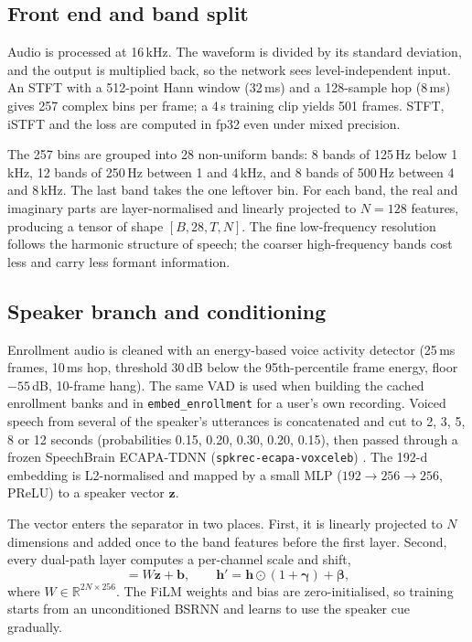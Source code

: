 \documentclass[11pt,a4paper]{article}
\begin{document}
\subsection{Front end and band split}
Audio is processed at 16\,kHz. The waveform is divided by its standard deviation, and the output
is multiplied back, so the network sees level-independent input. An STFT with a 512-point Hann
window (32\,ms) and a 128-sample hop (8\,ms) gives 257 complex bins per frame; a 4\,s training clip
yields 501 frames. STFT, iSTFT and the loss are computed in fp32 even under mixed precision.

The 257 bins are grouped into 28 non-uniform bands: 8 bands of 125\,Hz below 1\,kHz, 12 bands of
250\,Hz between 1 and 4\,kHz, and 8 bands of 500\,Hz between 4 and 8\,kHz. The last band takes the
one leftover bin. For each band, the real and imaginary parts are layer-normalised and linearly
projected to $N=128$ features, producing a tensor of shape $[B,28,T,N]$. The fine low-frequency
resolution follows the harmonic structure of speech; the coarser high-frequency bands cost less
and carry less formant information.

\subsection{Speaker branch and conditioning}
Enrollment audio is cleaned with an energy-based voice activity detector (25\,ms frames, 10\,ms
hop, threshold 30\,dB below the 95th-percentile frame energy, floor $-55$\,dB, 10-frame hang). The
same VAD is used when building the cached enrollment banks and in \texttt{embed\_enrollment} for a
user's own recording. Voiced speech from several of the speaker's utterances is concatenated and
cut to 2, 3, 5, 8 or 12 seconds (probabilities 0.15, 0.20, 0.30, 0.20, 0.15), then passed through
a frozen SpeechBrain ECAPA-TDNN (\texttt{spkrec-ecapa-voxceleb})
\cite{ravanelli2021speechbrain,desplanques2020ecapa}. The 192-d embedding is L2-normalised and
mapped by a small MLP ($192\to256\to256$, PReLU) to a speaker vector $\mathbf{z}$.

The vector enters the separator in two places. First, it is linearly projected to $N$ dimensions
and added once to the band features before the first layer. Second, every dual-path layer computes
a per-channel scale and shift,
\begin{equation}
  [\boldsymbol\gamma,\boldsymbol\beta] = W\mathbf{z}+\mathbf{b},\qquad
  \mathbf{h}' = \mathbf{h}\odot(1+\boldsymbol\gamma)+\boldsymbol\beta ,
\end{equation}
where $W\in\mathbb{R}^{2N\times256}$. The FiLM weights and bias are zero-initialised, so training
starts from an unconditioned BSRNN and learns to use the speaker cue gradually.
\end{document}

